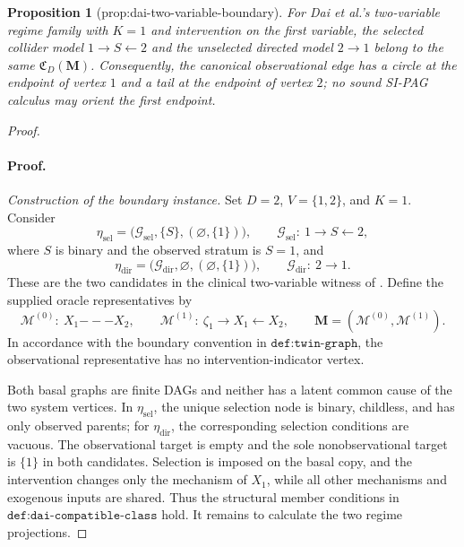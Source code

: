 \documentclass{article}
\newtheorem{proposition}{Proposition}
\begin{document}
\begin{proposition}[prop:dai-two-variable-boundary]\label{prop:dai-two-variable-boundary}
For Dai et al.'s two-variable regime family with \(K=1\) and intervention on the first variable, the selected collider model \(1\to S\leftarrow2\) and the unselected directed model \(2\to1\) belong to the same \(\mathfrak C_D(\mathbf M)\). Consequently, the canonical observational edge has a circle at the endpoint of vertex \(1\) and a tail at the endpoint of vertex \(2\); no sound SI-PAG calculus may orient the first endpoint.
\end{proposition}
\begin{proof}
\paragraph{Proof.}
\emph{Construction of the boundary instance.}
Set \(D=2\), \(V=\{1,2\}\), and \(K=1\).  Consider
\[
 \eta_{\mathrm{sel}}
 =\bigl(\mathcal G_{\mathrm{sel}},\{S\},(\varnothing,\{1\})\bigr),
 \qquad
 \mathcal G_{\mathrm{sel}}:\ 1\longrightarrow S\longleftarrow2,
\]
where \(S\) is binary and the observed stratum is \(S=1\), and
\[
 \eta_{\mathrm{dir}}
 =\bigl(\mathcal G_{\mathrm{dir}},\varnothing,(\varnothing,\{1\})\bigr),
 \qquad
 \mathcal G_{\mathrm{dir}}:\ 2\longrightarrow1.
\]
These are the two candidates in the clinical two-variable witness of
\cite{DaiEtAl2025SelectionIntervention}.  Define the supplied oracle representatives by
\[
 \mathcal M^{(0)}:\ X_1\mathbin{---}X_2,
 \qquad
 \mathcal M^{(1)}:\
 \zeta_1\longrightarrow X_1\longleftarrow X_2,
 \qquad
 \mathbf M=(\mathcal M^{(0)},\mathcal M^{(1)}).
 \tag{1}
\]
In accordance with the boundary convention in \(\texttt{def:twin-graph}\), the
observational representative has no intervention-indicator vertex.

Both basal graphs are finite DAGs and neither has a latent common cause of the two
system vertices.  In \(\eta_{\mathrm{sel}}\), the unique selection node is binary,
childless, and has only observed parents; for \(\eta_{\mathrm{dir}}\), the corresponding
selection conditions are vacuous.  The observational target is empty and the sole
nonobservational target is \(\{1\}\) in both candidates.  Selection is imposed on the
basal copy, and the intervention changes only the mechanism of \(X_1\), while all
other mechanisms and exogenous inputs are shared.  Thus the structural member
conditions in \(\texttt{def:dai-compatible-class}\) hold.  It remains to calculate the
two regime projections.


\end{proof}
\end{document}
